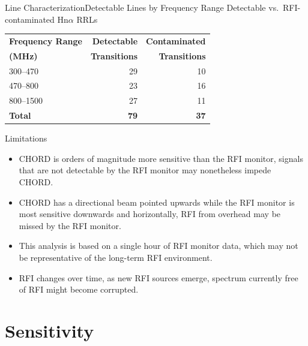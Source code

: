 \documentclass[aspectratio=169]{beamer}
\begin{document}
\begin{frame}{Line Characterization}{Detectable Lines by Frequency Range}
  \centering
  {Detectable vs.\ RFI-contaminated Hn$\alpha$ RRLs}
  \par\medskip
  \begin{tabular}{lrr}
    \toprule
    \textbf{Frequency Range} & \textbf{Detectable} & \textbf{Contaminated} \\
    \textbf{(MHz)} & \textbf{Transitions} & \textbf{Transitions} \\
    \midrule
    300--470   & 29 & 10 \\
    470--800   & 23 & 16 \\
    800--1500  & 27 & 11 \\
    \midrule
    \textbf{Total} & \textbf{79} & \textbf{37} \\
    \bottomrule
  \end{tabular}
  \par\medskip
\end{frame}

\begin{frame}{Limitations}{}
\begin{itemize}
    \item CHORD is orders of magnitude more sensitive than the RFI monitor, signals that are not detectable by the RFI monitor may nonetheless impede CHORD.
    \item CHORD has a directional beam pointed upwards while the RFI monitor is most sensitive downwards and horizontally, RFI from overhead may be missed by the RFI monitor.
    \item This analysis is based on a single hour of RFI monitor data, which may not be representative of the long-term RFI environment.
    \item RFI changes over time, as new RFI sources emerge, spectrum currently free of RFI might become corrupted.
\end{itemize}
\end{frame}

\section{Sensitivity}
\end{document}
